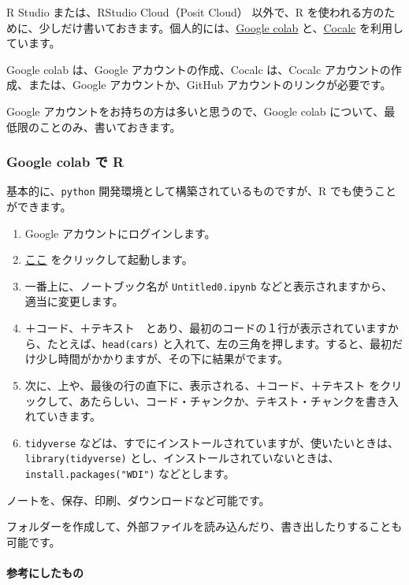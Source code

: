 \documentclass[
]{bxjsbook}
\providecommand{\tightlist}{%
  \setlength{\itemsep}{0pt}\setlength{\parskip}{0pt}}
\theoremstyle{definition}
\theoremstyle{definition}
\theoremstyle{definition}
\theoremstyle{definition}
\theoremstyle{remark}
\begin{document}
R Studio または、RStudio Cloud（Posit Cloud） 以外で、R を使われる方のために、少しだけ書いておきます。個人的には、\href{https://colab.research.google.com}{Google colab} と、\href{https://cocalc.com}{Cocalc} を利用しています。

Google colab は、Google アカウントの作成、Cocalc は、Cocalc アカウントの作成、または、Google アカウントか、GitHub アカウントのリンクが必要です。

Google アカウントをお持ちの方は多いと思うので、Google colab について、最低限のことのみ、書いておきます。

\hypertarget{google-colab-ux3067-r}{%
\subsubsection{Google colab で R}\label{google-colab-ux3067-r}}

基本的に、\texttt{python} 開発環境として構築されているものですが、R でも使うことができます。

\begin{enumerate}
\def\labelenumi{\arabic{enumi}.}
\tightlist
\item
  Google アカウントにログインします。
\item
  \href{https://colab.research.google.com/\#create=true\&language=r}{ここ} をクリックして起動します。
\item
  一番上に、ノートブック名が \texttt{Untitled0.ipynb} などと表示されますから、適当に変更します。
\item
  ＋コード、＋テキスト　とあり、最初のコードの１行が表示されていますから、たとえば、\texttt{head(cars)} と入れて、左の三角を押します。すると、最初だけ少し時間がかかりますが、その下に結果がでます。
\item
  次に、上や、最後の行の直下に、表示される、＋コード、＋テキスト をクリックして、あたらしい、コード・チャンクか、テキスト・チャンクを書き入れていきます。
\item
  \texttt{tidyverse} などは、すでにインストールされていますが、使いたいときは、\texttt{library(tidyverse)} とし、インストールされていないときは、\texttt{install.packages("WDI")} などとします。
\end{enumerate}

ノートを、保存、印刷、ダウンロードなど可能です。

フォルダーを作成して、外部ファイルを読み込んだり、書き出したりすることも可能です。

\hypertarget{ux53c2ux8003ux306bux3057ux305fux3082ux306e}{%
\paragraph{参考にしたもの}\label{ux53c2ux8003ux306bux3057ux305fux3082ux306e}}
\end{document}
